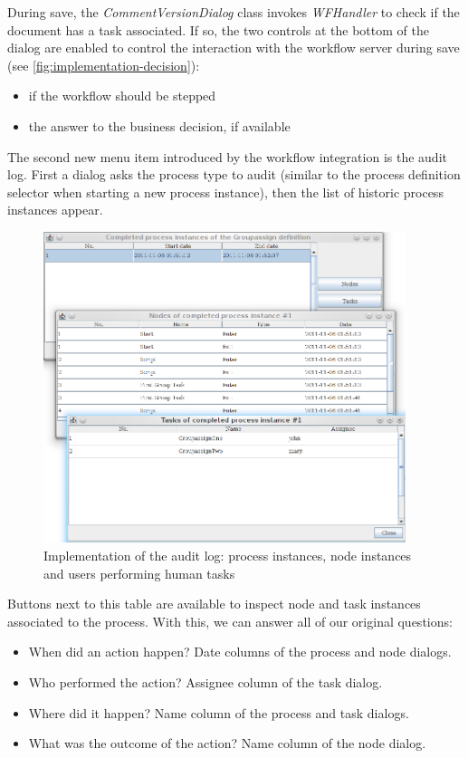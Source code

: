 During save, the \emph{CommentVersionDialog} class invokes \emph{WFHandler} to
check if the document has a task associated. If so, the two controls at the
bottom of the dialog are enabled to control the interaction with the workflow
server during save (see \autoref{fig:implementation-decision}):

\begin{itemize}
\item if the workflow should be stepped
\item the answer to the business decision, if available
\end{itemize}


The second new menu item introduced by the workflow integration is the audit
log. First a dialog asks the process type to audit (similar to the process
definition selector when starting a new process instance), then the list of
historic process instances appear.

\begin{figure}[H]
\centering
\includegraphics[width=400px,keepaspectratio]{implementation-auditlog.png}
\caption{Implementation of the audit log: process instances, node instances and users performing human tasks}
\label{fig:implementation-auditlog}
\end{figure}

Buttons next to this table are available to inspect node and task instances
associated to the process. With this, we can answer all of our original
questions:

\begin{itemize}
\item When did an action happen? Date columns of the process and node dialogs.
\item Who performed the action? Assignee column of the task dialog.
\item Where did it happen? Name column of the process and task dialogs.
\item What was the outcome of the action? Name column of the node dialog.
\end{itemize}


